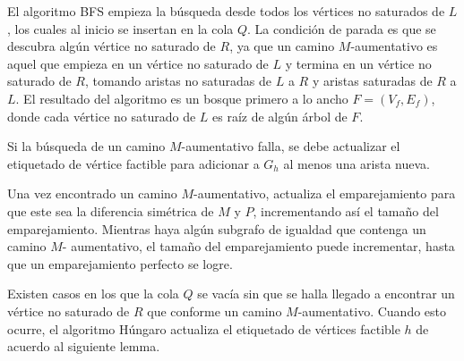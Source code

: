 \documentclass[10pt]{article} %
\begin{document}
El algoritmo BFS empieza la b\'usqueda desde todos los v\'ertices no saturados de $L$, los cuales al inicio se insertan en la cola $Q$. La condici\'on de parada es que se descubra alg\'un v\'ertice no saturado de $R$, ya que un camino $M$-aumentativo es aquel que empieza en un v\'ertice no saturado de $L$ y termina en un v\'ertice no saturado de $R$, tomando aristas no saturadas de $L$ a $R$ y aristas saturadas de $R$ a $L$. El resultado del algoritmo es un bosque primero a lo ancho $F = (V_f, E_f)$, donde cada v\'ertice no saturado de $L$ es ra\'iz de alg\'un \'arbol de $F$.


Si la b\'usqueda de un camino $M$-aumentativo falla, se debe actualizar el etiquetado de v\'ertice factible para adicionar a $G_h$ al menos una arista nueva.

Una vez encontrado un camino $M$-aumentativo, actualiza el emparejamiento para que este sea la diferencia sim\'etrica de $M$ y $P$, incrementando as\'i el tama\~no del emparejamiento.  Mientras haya alg\'un subgrafo de igualdad que contenga un camino $M$- aumentativo, el tama\~no del emparejamiento puede incrementar, hasta que un emparejamiento perfecto se logre.

Existen casos en los que la cola $Q$ se vac\'ia sin que se halla llegado a encontrar un v\'ertice no saturado de $R$ que conforme un camino $M$-aumentativo. Cuando esto ocurre, el algoritmo H\'ungaro actualiza el etiquetado de v\'ertices factible $h$ de acuerdo al siguiente lemma.
\end{document}
